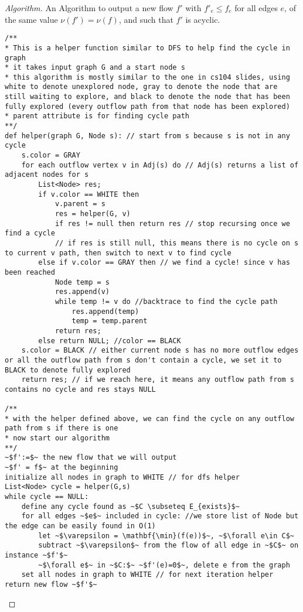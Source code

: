 \documentclass[openany]{article}
\begin{document}
\begin{proof}[Algorithm]{}
		\renewcommand{\qedsymbol}{}
		An Algorithm to output a new flow $f'$ with $f'_e \leq f_e$ for all edges $e$, of the same value $\nu(f') = \nu(f)$, and such that $f'$ is acyclic.
		\begin{lstlisting}[basicstyle=\fontsize{8}{9}\selectfont\ttfamily]
/**
* This is a helper function similar to DFS to help find the cycle in graph
* it takes input graph G and a start node s
* this algorithm is mostly similar to the one in cs104 slides, using white to denote unexplored node, gray to denote the node that are still waiting to explore, and black to denote the node that has been fully explored (every outflow path from that node has been explored)
* parent attribute is for finding cycle path
**/
def helper(graph G, Node s): // start from s because s is not in any cycle
    s.color = GRAY
    for each outflow vertex v in Adj(s) do // Adj(s) returns a list of adjacent nodes for s
        List<Node> res;
        if v.color == WHITE then
            v.parent = s
            res = helper(G, v)
            if res != null then return res // stop recursing once we find a cycle
            // if res is still null, this means there is no cycle on s to current v path, then switch to next v to find cycle
        else if v.color == GRAY then // we find a cycle! since v has been reached 
            Node temp = s
            res.append(v)
            while temp != v do //backtrace to find the cycle path
                res.append(temp)
                temp = temp.parent
            return res;
        else return NULL; //color == BLACK
    s.color = BLACK // either current node s has no more outflow edges or all the outflow path from s don't contain a cycle, we set it to BLACK to denote fully explored
    return res; // if we reach here, it means any outflow path from s contains no cycle and res stays NULL
    
/**
* with the helper defined above, we can find the cycle on any outflow path from s if there is one
* now start our algorithm
**/
~$f':=$~ the new flow that we will output
~$f' = f$~ at the beginning
initialize all nodes in graph to WHITE // for dfs helper
List<Node> cycle = helper(G,s)
while cycle == NULL:
    define any cycle found as ~$C \subseteq E_{exists}$~
    for all edges ~$e$~ included in cycle: //we store list of Node but the edge can be easily found in O(1)
        let ~$\varepsilon = \mathbf{\min}(f(e))$~, ~$\forall e\in C$~
        subtract ~$\varepsilon$~ from the flow of all edge in ~$C$~ on instance ~$f'$~
        ~$\forall e$~ in ~$C:$~ ~$f'(e)=0$~, delete e from the graph
    set all nodes in graph to WHITE // for next iteration helper
return new flow ~$f'$~
		\end{lstlisting} 
\end{proof}
\end{document}
